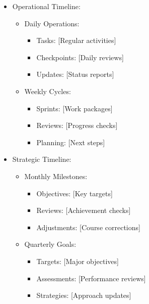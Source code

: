\documentclass{article}
\begin{document}
\begin{itemize}
    \item Operational Timeline:
    \begin{itemize}
        \item Daily Operations:
        \begin{itemize}
            \item Tasks: [Regular activities]
            \item Checkpoints: [Daily reviews]
            \item Updates: [Status reports]
        \end{itemize}
        \item Weekly Cycles:
        \begin{itemize}
            \item Sprints: [Work packages]
            \item Reviews: [Progress checks]
            \item Planning: [Next steps]
        \end{itemize}
    \end{itemize}

    \item Strategic Timeline:
    \begin{itemize}
        \item Monthly Milestones:
        \begin{itemize}
            \item Objectives: [Key targets]
            \item Reviews: [Achievement checks]
            \item Adjustments: [Course corrections]
        \end{itemize}
        \item Quarterly Goals:
        \begin{itemize}
            \item Targets: [Major objectives]
            \item Assessments: [Performance reviews]
            \item Strategies: [Approach updates]
        \end{itemize}
    \end{itemize}
\end{itemize}
\end{document}
